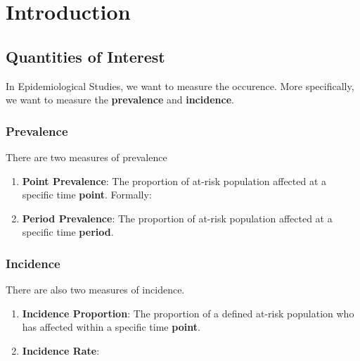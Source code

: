 \section{Introduction}
\subsection{Quantities of Interest}
In Epidemiological Studies, we want to measure the occurence. More specifically, we want to measure the \textbf{prevalence} and \textbf{incidence}.
\subsubsection*{Prevalence}
There are two measures of prevalence
\begin{enumerate}
    \item \textbf{Point Prevalence}: The proportion of at-risk population affected at a specific time \textbf{point}. Formally:
    \item \textbf{Period Prevalence}: The proportion of at-risk population affected at a specific time \textbf{period}.
\end{enumerate}
\subsubsection*{Incidence}
There are also two measures of incidence.
\begin{enumerate}
    \item \textbf{Incidence Proportion}: The proportion of a defined at-risk population who has affected within a specific time \textbf{point}.
    \item \textbf{Incidence Rate}: 
\end{enumerate}
